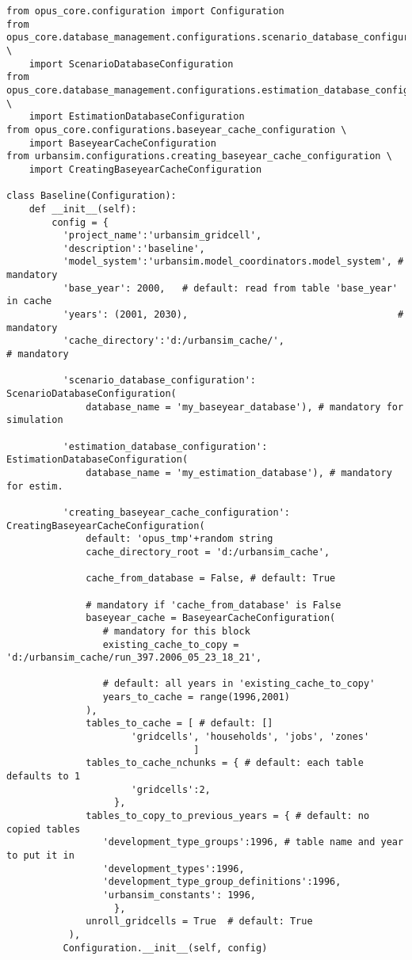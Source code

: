 \baseyearcacheindex
\begin{verbatim}
from opus_core.configuration import Configuration
from opus_core.database_management.configurations.scenario_database_configuration \
    import ScenarioDatabaseConfiguration
from opus_core.database_management.configurations.estimation_database_configuration \
    import EstimationDatabaseConfiguration
from opus_core.configurations.baseyear_cache_configuration \
    import BaseyearCacheConfiguration
from urbansim.configurations.creating_baseyear_cache_configuration \
    import CreatingBaseyearCacheConfiguration
    
class Baseline(Configuration):
    def __init__(self):
        config = {
          'project_name':'urbansim_gridcell',
          'description':'baseline',  
          'model_system':'urbansim.model_coordinators.model_system', # mandatory
          'base_year': 2000,   # default: read from table 'base_year' in cache
          'years': (2001, 2030),                                     # mandatory
          'cache_directory':'d:/urbansim_cache/',	                  # mandatory
          
          'scenario_database_configuration': ScenarioDatabaseConfiguration(
              database_name = 'my_baseyear_database'), # mandatory for simulation
              
          'estimation_database_configuration': EstimationDatabaseConfiguration(
              database_name = 'my_estimation_database'), # mandatory for estim.
              
          'creating_baseyear_cache_configuration': CreatingBaseyearCacheConfiguration(
              default: 'opus_tmp'+random string
              cache_directory_root = 'd:/urbansim_cache',
              
              cache_from_database = False, # default: True
              
              # mandatory if 'cache_from_database' is False
              baseyear_cache = BaseyearCacheConfiguration(
                 # mandatory for this block
                 existing_cache_to_copy = 'd:/urbansim_cache/run_397.2006_05_23_18_21',
            
                 # default: all years in 'existing_cache_to_copy'
                 years_to_cache = range(1996,2001)
              ),
              tables_to_cache = [ # default: []
                      'gridcells', 'households', 'jobs', 'zones'
                                 ]
              tables_to_cache_nchunks = { # default: each table defaults to 1
                      'gridcells':2,
                   },
              tables_to_copy_to_previous_years = { # default: no copied tables
                 'development_type_groups':1996, # table name and year to put it in
                 'development_types':1996,
                 'development_type_group_definitions':1996,
                 'urbansim_constants': 1996,
                   },
              unroll_gridcells = True  # default: True
           ),
          Configuration.__init__(self, config)
\end{verbatim}

